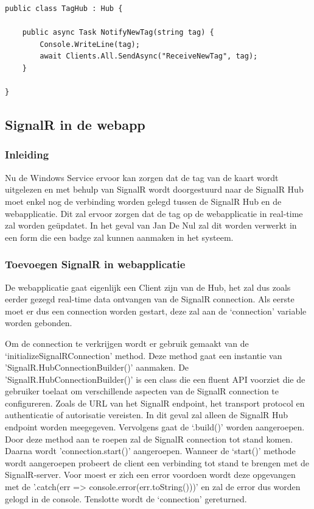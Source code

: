 \begin{verbatim} 
public class TagHub : Hub {
    
    public async Task NotifyNewTag(string tag) {
        Console.WriteLine(tag);
        await Clients.All.SendAsync("ReceiveNewTag", tag);
    }

}
\end{verbatim}

\subsection{SignalR in de webapp}

\subsubsection{Inleiding}
Nu de Windows Service ervoor kan zorgen dat de tag van de kaart wordt uitgelezen en met behulp van SignalR wordt doorgestuurd naar de SignalR Hub moet enkel nog de verbinding worden gelegd tussen de SignalR Hub en de webapplicatie. Dit zal ervoor zorgen dat de tag op de webapplicatie in real-time zal worden geüpdatet. In het geval van Jan De Nul zal dit worden verwerkt in een form die een badge zal kunnen aanmaken in het systeem. 

\subsubsection{Toevoegen SignalR in webapplicatie}
De webapplicatie gaat eigenlijk een Client zijn van de Hub, het zal dus zoals eerder gezegd real-time data ontvangen van de SignalR connection. Als eerste moet er dus een connection worden gestart, deze zal aan de ‘connection’ variable worden gebonden.  

Om de connection te verkrijgen wordt er gebruik gemaakt van de ‘initializeSignalRConnection’ method. Deze method gaat een instantie van \newline 'SignalR.HubConnectionBuilder()’ aanmaken. De 'SignalR.HubConnectionBuilder()’ is een class die een fluent API voorziet die de gebruiker toelaat om verschillende aspecten van de SignalR connection te configureren. Zoals de URL van het SignalR endpoint, het transport protocol en authenticatie of autorisatie vereisten. In dit geval zal alleen de SignalR Hub endpoint worden meegegeven. Vervolgens gaat de ‘.build()’ worden aangeroepen. Door deze method aan te roepen zal de SignalR connection tot stand komen. Daarna wordt 'connection.start()’ aangeroepen. Wanneer de ‘start()’ methode wordt aangeroepen probeert de client een verbinding tot stand te brengen met de SignalR-server. Voor moest er zich een error voordoen wordt deze opgevangen met de '.catch(err => console.error(err.toString()))' en zal de error dus worden gelogd in de console. Tenslotte wordt de ‘connection’ gereturned. 


